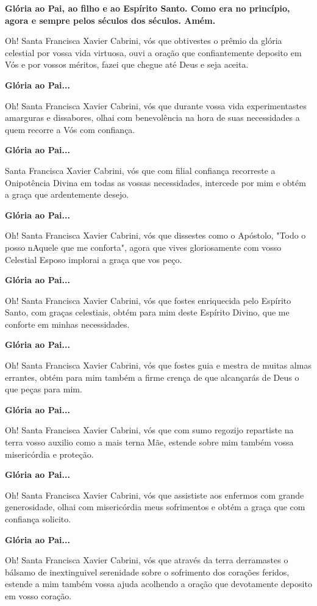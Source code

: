 \documentclass[11pt]{article}
\begin{document}
\textbf{Glória ao Pai, ao filho e ao Espírito Santo. Como era no princípio, agora e sempre pelos séculos dos séculos. Amém.}\label{gloria}

Oh! Santa Francisca Xavier Cabrini, vós que obtivestes o prêmio da glória celestial por vossa vida virtuosa, ouvi a oração que confiantemente deposito em Vós e por vossos méritos, fazei que chegue até Deus e seja aceita.

\textbf{Glória ao Pai...}

Oh! Santa Francisca Xavier Cabrini, vós que durante vossa vida experimentastes amarguras e dissabores, olhai com benevolência na hora de suas necessidades a quem recorre a Vós com confiança.

\textbf{Glória ao Pai...}

Santa Francisca Xavier Cabrini, vós que com filial confiança recorreste a Onipotência Divina em todas as vossas necessidades, intercede por mim e obtém a graça que ardentemente desejo.

\textbf{Glória ao Pai...}

Oh! Santa Francisca Xavier Cabrini, vós que dissestes como o Apóstolo, "Todo o posso nAquele que me conforta", agora que vives gloriosamente com vosso Celestial Esposo implorai a graça que vos peço.

\textbf{Glória ao Pai...}

Oh! Santa Francisca Xavier Cabrini, vós que fostes enriquecida pelo Espírito Santo, com graças celestiais, obtém para mim deste Espírito Divino, que me conforte em minhas necessidades.

\textbf{Glória ao Pai...}

Oh! Santa Francisca Xavier Cabrini, vós que fostes guia e mestra de muitas almas errantes, obtém para mim também a firme crença de que alcançarás de Deus o que peças para mim.

\textbf{Glória ao Pai...}

Oh! Santa Francisca Xavier Cabrini, vós que com sumo regozijo repartiste na terra vosso auxilio como a mais terna Mãe, estende sobre mim também vossa misericórdia e proteção.

\textbf{Glória ao Pai...}

Oh! Santa Francisca Xavier Cabrini, vós que assististe aos enfermos com grande generosidade, olhai com misericórdia meus sofrimentos e obtém a graça que com confiança solicito.

\textbf{Glória ao Pai...}

Oh! Santa Francisca Xavier Cabrini, vós que através da terra derramastes o bálsamo de inextinguivel serenidade sobre o sofrimento dos corações feridos, estende a mim também vossa ajuda acolhendo a oração que devotamente deposito em vosso coração.
\end{document}

